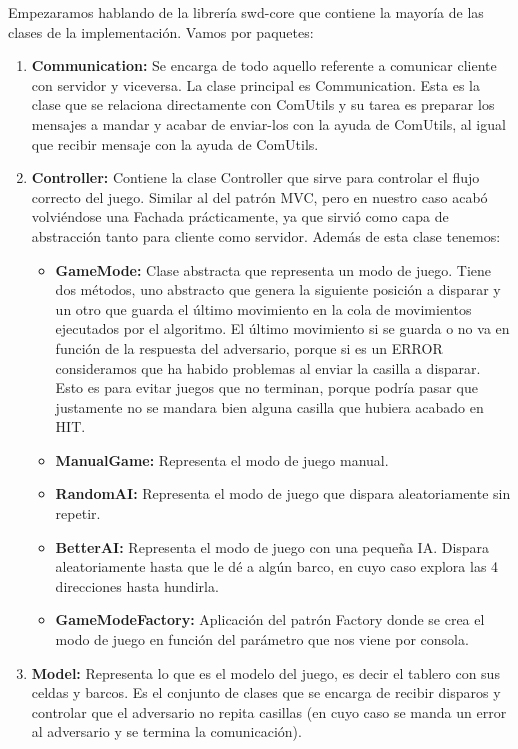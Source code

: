 Empezaramos hablando de la librería swd-core que contiene la mayoría de las clases de la implementación. Vamos por paquetes:
\begin{enumerate}
\item \textbf{Communication:} Se encarga de todo aquello referente a comunicar cliente con servidor y viceversa. La clase principal es Communication. Esta es la clase que se relaciona directamente con ComUtils y su tarea es preparar los mensajes a mandar y acabar de enviar-los con la ayuda de ComUtils, al igual que recibir mensaje con la ayuda de ComUtils.
\item \textbf{Controller:} Contiene la clase Controller que sirve para controlar el flujo correcto del juego. Similar al del patrón MVC, pero en nuestro caso acabó volviéndose una Fachada prácticamente, ya que sirvió como capa de abstracción tanto para cliente como servidor. Además de esta clase tenemos:
	\begin{itemize}
	\item \textbf{GameMode:} Clase abstracta que representa un modo de juego. Tiene dos métodos, uno abstracto que genera la siguiente posición a disparar y un otro que guarda el último movimiento en la cola de movimientos ejecutados por el algoritmo. El último movimiento si se guarda o no va en función de la respuesta del adversario, porque si es un ERROR consideramos que ha habido problemas al enviar la casilla a disparar. Esto es para evitar juegos que no terminan, porque podría pasar que justamente no se mandara bien alguna casilla que hubiera acabado en HIT.
	\item \textbf{ManualGame:} Representa el modo de juego manual.
	\item \textbf{RandomAI:} Representa el modo de juego que dispara aleatoriamente sin repetir.
	\item \textbf{BetterAI:} Representa el modo de juego con una pequeña IA. Dispara aleatoriamente hasta que le dé a algún barco, en cuyo caso explora las 4 direcciones hasta hundirla.
	\item \textbf{GameModeFactory:} Aplicación del patrón Factory donde se crea el modo de juego en función del parámetro que nos viene por consola.
	\end{itemize}
\item \textbf{Model:} Representa lo que es el modelo del juego, es decir el tablero con sus celdas y barcos. Es el conjunto de clases que se encarga de recibir disparos y controlar que el adversario no repita casillas (en cuyo caso se manda un error al adversario y se termina la comunicación).

\end{enumerate}
